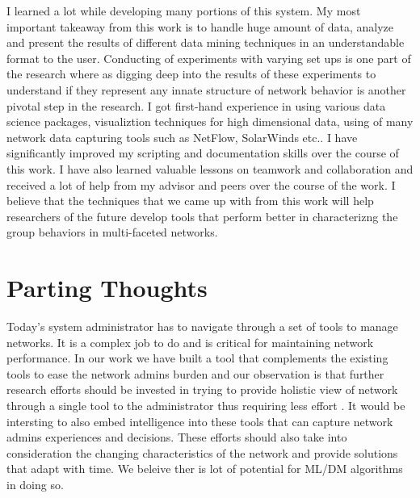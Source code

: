 I learned a lot while developing many portions of this system. My most important takeaway from this work is to handle huge amount of data, analyze and present the results of different data mining techniques in an understandable format to the user. Conducting of experiments with varying set ups is one part of the research where as digging deep into the results of these experiments to understand if they represent any innate structure of network behavior is another pivotal step in the research. 
I got first-hand experience in using various data science packages,  visualiztion techniques for high dimensional data, using of many network data capturing tools such as NetFlow, SolarWinds etc..
I have significantly improved my scripting and documentation skills over the course of this work. I have also learned valuable lessons on teamwork and collaboration and received a lot of help from my advisor and peers over the course of the work. I believe that the techniques  that we came up with from this work will help researchers of the future develop tools that perform  better in characterizng the group behaviors in multi-faceted networks.

\section{Parting Thoughts}
Today's system administrator has to navigate through a set of tools to manage networks. It is a complex job to do and is critical for maintaining network performance. In our work we have built a tool that complements the existing tools to ease the network admins burden and our observation is that further research efforts should be invested in trying to provide holistic view of network through a single tool to the administrator thus requiring less effort . It would be intersting to also embed intelligence into these tools that can capture network admins experiences and decisions. These efforts should also take into consideration the changing characteristics of the network and provide solutions that adapt with time. We beleive ther is lot of potential for ML/DM algorithms in doing so.
